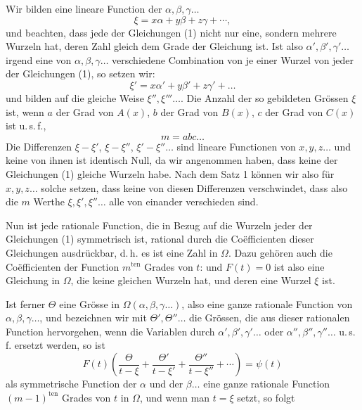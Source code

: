 
Wir bilden eine lineare Function der $\alpha, \beta, \gamma \ldots$
\[
\xi = x\alpha + y\beta + z\gamma + \cdots,
\]
und beachten, dass jede der Gleichungen (1) nicht nur eine,
sondern mehrere Wurzeln hat, deren Zahl gleich dem Grade der
Gleichung ist. Ist also $\alpha', \beta', \gamma' \ldots$ irgend eine von
$\alpha, \beta, \gamma \ldots$ verschiedene Combination von je einer Wurzel von jeder der Gleichungen (1), so setzen wir:
\[
\xi' = x\alpha' + y\beta' + z\gamma' + \ldots
\]
und bilden auf die gleiche Weise $\xi'', \xi''' \ldots$. Die Anzahl der so
gebildeten Grössen $\xi$ ist, wenn $a$ der Grad von $A(x)$, $b$ der
Grad von $B(x)$, $c$ der Grad von $C(x)$ ist u.\,s.\,f.,
\[
m = abc \ldots
\]
Die Differenzen $\xi - \xi'$, $\xi - \xi''$, $\xi' - \xi'' \ldots$ sind lineare
Functionen von $x, y, z \ldots$ und keine von ihnen ist identisch
Null, da wir angenommen haben, dass keine der Gleichungen (1)
gleiche Wurzeln habe. Nach dem Satz 1 können wir also für
$x, y, z \ldots$ solche  setzen, dass keine von
diesen Differenzen verschwindet, dass also die $m$ Werthe $\xi, \xi', \xi'' \ldots$
alle von einander verschieden sind.

Nun ist jede rationale Function, die in Bezug auf die Wurzeln
jeder der Gleichungen (1) symmetrisch ist, rational durch die
Co\"efficienten dieser Gleichungen ausdrückbar, d.\,h. es ist eine
Zahl in $\Omega$. Dazu gehören auch die Co\"efficienten der Function
$m^{\text{ten}}$ Grades von $t$:
und $F(t) = 0$ ist also eine Gleichung in $\Omega$, die keine gleichen
Wurzeln hat, und deren eine Wurzel $\xi$ ist.

Ist ferner $\Theta$ eine Grösse in $\Omega(\alpha, \beta, \gamma \ldots)$, also eine ganze
rationale Function von $\alpha, \beta, \gamma \ldots$, und bezeichnen wir mit
$\Theta', \Theta'' \ldots$ die Grössen, die aus dieser rationalen Function
hervorgehen, wenn die Variablen durch $\alpha', \beta', \gamma' \ldots$ oder
$\alpha'', \beta'', \gamma'' \ldots$ u.\,s.\,f. ersetzt werden, so ist
\[
F(t) \left( \frac{\Theta}{t - \xi} + \frac{\Theta'}{t - \xi'} + \frac{\Theta''}{t - \xi''} + \cdots \right) = \psi(t)
\]
als symmetrische Function der $\alpha$ und der $\beta \ldots$ eine ganze
rationale Function $(m-1)^{\text{ten}}$ Grades von $t$ in $\Omega$, und wenn
man $t = \xi$ setzt, so folgt
